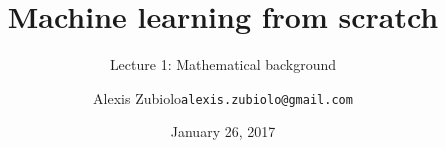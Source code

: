 \documentclass{beamer}
\title[Course presentation]{Machine learning from scratch}
\subtitle{Lecture 1: Mathematical background}
\author{Alexis Zubiolo\newline\texttt{alexis.zubiolo@gmail.com}}
\institute{Data Science Team Lead @ Adcash}
\date{January 26, 2017}
\begin{document}
\begin{frame}
  \titlepage
\end{frame}
\end{document}
